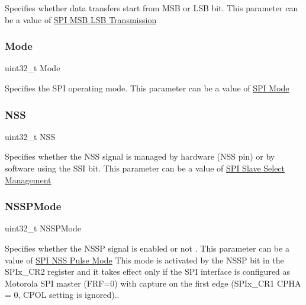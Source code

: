 Specifies whether data transfers start from M\+SB or L\+SB bit. This parameter can be a value of \hyperlink{group___s_p_i___m_s_b___l_s_b__transmission}{S\+PI M\+SB L\+SB Transmission} \mbox{\label{struct_s_p_i___init_type_def_a0ffc93ec511ed9cf1663f6939bd3e839}} 
\subsubsection{\texorpdfstring{Mode}{Mode}}
{\footnotesize\ttfamily uint32\+\_\+t Mode}

Specifies the S\+PI operating mode. This parameter can be a value of \hyperlink{group___s_p_i___mode}{S\+PI Mode} \mbox{\label{struct_s_p_i___init_type_def_ae4a064e48fd5945eda7210d515fed69c}} 
\subsubsection{\texorpdfstring{N\+SS}{NSS}}
{\footnotesize\ttfamily uint32\+\_\+t N\+SS}

Specifies whether the N\+SS signal is managed by hardware (N\+SS pin) or by software using the S\+SI bit. This parameter can be a value of \hyperlink{group___s_p_i___slave___select__management}{S\+PI Slave Select Management} \mbox{\label{struct_s_p_i___init_type_def_a537f238782f2847191f7d221ffaa6c9b}} 
\subsubsection{\texorpdfstring{N\+S\+S\+P\+Mode}{NSSPMode}}
{\footnotesize\ttfamily uint32\+\_\+t N\+S\+S\+P\+Mode}

Specifies whether the N\+S\+SP signal is enabled or not . This parameter can be a value of \hyperlink{group___s_p_i___n_s_s_p___mode}{S\+PI N\+SS Pulse Mode} This mode is activated by the N\+S\+SP bit in the S\+P\+Ix\+\_\+\+C\+R2 register and it takes effect only if the S\+PI interface is configured as Motorola S\+PI master (F\+RF=0) with capture on the first edge (S\+P\+Ix\+\_\+\+C\+R1 C\+P\+HA = 0, C\+P\+OL setting is ignored).. \mbox{\label{struct_s_p_i___init_type_def_a3db685adbdc6f7bfc7ad0191ba5ab277}} 
